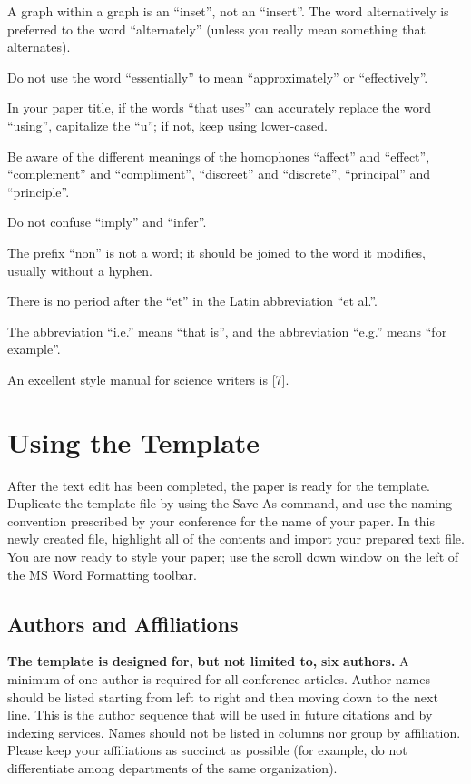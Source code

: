 \documentclass[preprint,12pt,authoryear]{elsarticle}
\begin{document}
A graph within a graph is an “inset”, not an “insert”. The word alternatively is preferred to the word “alternately” (unless you really mean something that alternates).

Do not use the word “essentially” to mean “approximately” or “effectively”.

In your paper title, if the words “that uses” can accurately replace the word “using”, capitalize the “u”; if not, keep using lower-cased.

Be aware of the different meanings of the homophones “affect” and “effect”, “complement” and “compliment”, “discreet” and “discrete”, “principal” and “principle”.

Do not confuse “imply” and “infer”.

The prefix “non” is not a word; it should be joined to the word it modifies, usually without a hyphen.

There is no period after the “et” in the Latin abbreviation “et al.”.

The abbreviation “i.e.” means “that is”, and the abbreviation “e.g.” means “for example”.

An excellent style manual for science writers is [7].

\section{Using the Template}

After the text edit has been completed, the paper is ready for the template. Duplicate the template file by using the Save As command, and use the naming convention prescribed by your conference for the name of your paper. In this newly created file, highlight all of the contents and import your prepared text file. You are now ready to style your paper; use the scroll down window on the left of the MS Word Formatting toolbar.

\subsection{Authors and Affiliations}

\textbf{The template is }\textbf{designed}\textbf{ for,}\textbf{ but not limited to}\textbf{,}\textbf{ }\textbf{six}\textbf{ authors.} A minimum of one author is required for all conference articles. Author names should be listed starting from left to right and then moving down to the next line. This is the author sequence that will be used in future citations and by indexing services. Names should not be listed in columns nor group by affiliation. Please keep your affiliations as succinct as possible (for example, do not differentiate among departments of the same organization).
\end{document}
